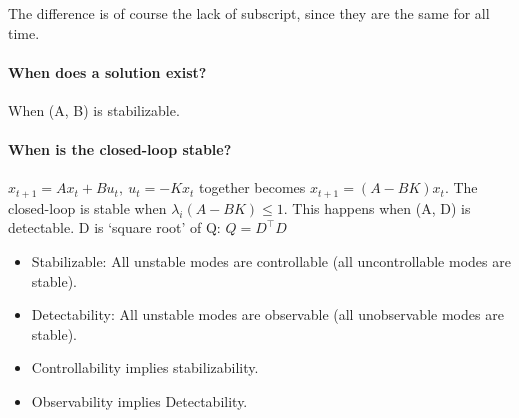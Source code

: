 \documentclass{article}
\begin{document}
The difference is of course the lack of subscript, since they are the same for all time.

\paragraph{When does a solution exist?} When (A, B) is stabilizable. 

\paragraph{When is the closed-loop stable?} $x_{t+1} = Ax_t + Bu_t,\  u_t = -Kx_t$ together becomes $x_{t+1} = (A-BK)x_t$. The closed-loop is stable when $\lambda_i(A-BK) \leq 1$. 
This happens when (A, D) is detectable. D is `square root' of Q: $Q = D^{\top}D$ 

\begin{itemize}
  \item Stabilizable: All unstable modes are controllable (all uncontrollable modes are stable).
  \item Detectability: All unstable modes are observable (all unobservable modes are stable).
  \item Controllability implies stabilizability. 
  \item Observability implies Detectability. 
\end{itemize}
\end{document}
